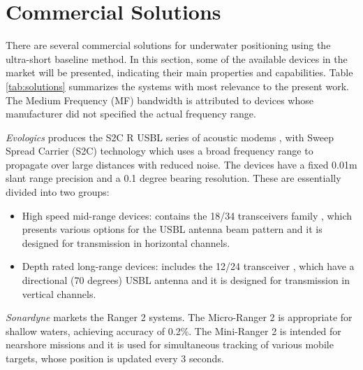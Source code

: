 %



\section{Commercial Solutions}

There are several commercial solutions for underwater positioning using the ultra-short baseline method. In this section, some of the available devices in the market will be presented, indicating their main properties and capabilities. Table \ref{tab:solutions} summarizes the systems with most relevance to the present work. The Medium Frequency (MF) bandwidth is attributed to devices whose manufacturer did not specified the actual frequency range.

\textit{Evologics} produces the S2C R USBL series of acoustic modems \cite{evologics1}, with Sweep Spread Carrier (S2C) technology \cite{evologics2} which uses a broad frequency range to propagate over large distances with reduced noise. The devices have a fixed 0.01m slant range precision and a 0.1 degree bearing resolution. These are essentially divided into two groups:
\begin{itemize}
	\item High speed mid-range devices: contains the 18/34 transceivers family \cite{evologics3}, which presents various options for the USBL antenna beam pattern and it is designed for transmission in horizontal channels.
	\item Depth rated long-range devices: includes the 12/24 transceiver \cite{evologics4}, which have a directional (70 degrees) USBL antenna  and it is designed for transmission in vertical channels.
\end{itemize}

\textit{Sonardyne} markets the Ranger 2 systems. The Micro-Ranger 2 \cite{sonardyne1} is appropriate for shallow waters, achieving accuracy of 0.2\%. The Mini-Ranger 2 is intended for nearshore missions and it is  used for simultaneous tracking of various mobile targets, whose position is updated every 3 seconds.

